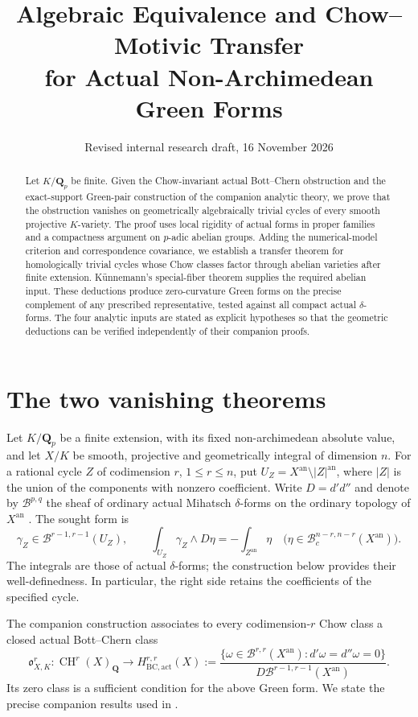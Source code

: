 \documentclass[11pt,reqno]{amsart}
\title[Algebraic equivalence and strong Green forms]{Algebraic Equivalence and Chow--Motivic Transfer\\for Actual Non-Archimedean Green Forms}
\author{}
\date{Revised internal research draft, 16 November 2026}
\newcommand{\Secref}[1]{{\hypersetup{linkcolor=mathteal}\Cref{#1}}}
\theoremstyle{definition}
\theoremstyle{remark}
\newcommand{\Q}{\mathbf Q}
\newcommand{\CH}{\operatorname{CH}}
\newcommand{\an}{\mathrm{an}}
\newcommand{\BC}{\mathrm{BC,act}}
\newcommand{\B}{\mathcal B}
\newcommand{\Obs}{\mathfrak o}
\numberwithin{equation}{section}
\begin{document}
\begin{abstract}
Let $K/\Q_p$ be finite.  Given the Chow-invariant actual
Bott--Chern obstruction and the exact-support Green-pair construction
of the companion analytic theory, we prove that the obstruction
vanishes on geometrically algebraically trivial cycles of every
smooth projective $K$-variety.  The proof uses local rigidity of
actual forms in proper families and a compactness argument on
$p$-adic abelian groups.  Adding the numerical-model criterion and
correspondence covariance, we establish a transfer theorem for
homologically trivial cycles whose Chow classes factor through
abelian varieties after finite extension.  K\"unnemann's special-fiber
theorem supplies the required abelian input.  These deductions produce
zero-curvature Green forms on the precise complement of any
prescribed representative, tested against all compact actual
$\delta$-forms.  The four analytic inputs are stated as explicit
hypotheses so that the geometric deductions can be verified
independently of their companion proofs.
\end{abstract}
\maketitle
\pagestyle{plain}
\tableofcontents

\section{The two vanishing theorems}\label{sec:intro}

Let $K/\Q_p$ be a finite extension, with its fixed non-archimedean
absolute value, and let $X/K$ be smooth, projective and geometrically
integral of dimension $n$.  For a rational cycle $Z$ of codimension
$r$, $1\le r\le n$, put $U_Z=X^{\an}\setminus|Z|^{\an}$, where
$|Z|$ is the union of the components with nonzero coefficient.
Write $D=d'd''$ and denote by $\B^{p,q}$ the sheaf of ordinary actual
Mihatsch $\delta$-forms on the ordinary topology of $X^{\an}$
\cite{Mihatsch}.  The sought form is
\[
  \gamma_Z\in\B^{r-1,r-1}(U_Z),
  \qquad
  \int_{U_Z}\gamma_Z\wedge D\eta
          =-\int_{Z^{\an}}\eta
  \quad\bigl(\eta\in\B_c^{n-r,n-r}(X^{\an})\bigr).
\]
The integrals are those of actual $\delta$-forms; the construction
below provides their well-definedness.  In particular, the right
side retains the coefficients of the specified cycle.

The companion construction associates to every codimension-$r$ Chow
class a closed actual Bott--Chern class
\[
\Obs^r_{X,K}:\CH^r(X)_\Q\longrightarrow
 H^{r,r}_{\BC}(X):=
 \frac{\{\omega\in\B^{r,r}(X^{\an}):d'\omega=d''\omega=0\}}
 {D\B^{r-1,r-1}(X^{\an})}.
\]
Its zero class is a sufficient condition for the above Green form.
We state the precise companion results used in \Secref{sec:inputs}.
\end{document}
